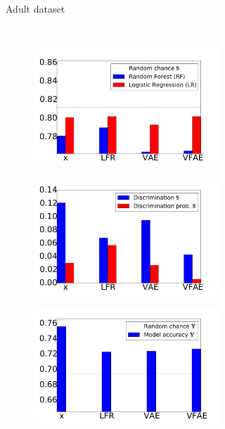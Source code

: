 \begin{figure}[ht]
\begin{subfigure}{\linewidth}
\begin{subfigure}{.329\textwidth}
  \end{subfigure}
  \caption{Adult dataset}
  \end{subfigure} \\
  \begin{subfigure}{\linewidth}
  \begin{subfigure}{.329\textwidth}
    \centering
        \includegraphics[width=1.1\linewidth]{german_s.pdf}
  \end{subfigure}%
    \begin{subfigure}{.329\textwidth}
    \centering
        \includegraphics[width=1.1\linewidth]{german_discr.pdf}
  \end{subfigure}%
  \begin{subfigure}{.329\textwidth}
    \centering
        \includegraphics[width=1.1\linewidth]{german_y.pdf}

\end{subfigure}
\end{subfigure}
\end{figure}

